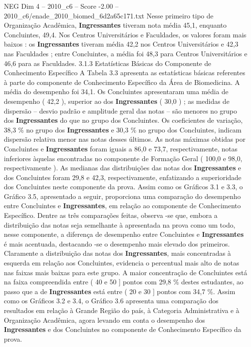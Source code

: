 \begin{textsample}{NEG Dim 4 – 2010\_c6 – Score -2.00 – 2010\_c6/enade\_2010\_biomed\_6d2a65c171.txt}
Nesse primeiro tipo de Organização Acadêmica, \textbf{Ingressantes} tiveram nota média 45,1, enquanto Concluintes, 49,4.
Nos Centros Universitários e Faculdades, os valores foram mais baixos : os \textbf{Ingressantes} tiveram média 42,2 nos Centros Universitários e 42,3 nas Faculdades ; entre Concluintes, a média foi 48,3 para Centros Universitários e 46,6 para as Faculdades. 3.1.3 Estatísticas Básicas do Componente de Conhecimento Específico A Tabela 3.3 apresenta as estatísticas básicas referentes à parte do componente de Conhecimento Específico da Área de Biomedicina.
A média do desempenho foi 34,1.
Os Concluintes apresentaram uma média de desempenho ( 42,2 ), superior ao dos \textbf{Ingressantes} ( 30,0 ) ; as medidas de dispersão – desvio padrão e amplitude geral das notas – são menores no grupo dos \textbf{Ingressantes} do que no grupo dos Concluintes.
Os coeficientes de variação, 38,3 \% no grupo dos \textbf{Ingressantes} e 30,3 \% no grupo dos Concluintes, indicam dispersão relativa menor nas notas desses últimos.
As notas máximas obtidas por Concluintes e \textbf{Ingressantes} foram iguais a 86,0 e 73,7, respectivamente, notas inferiores àquelas encontradas no componente de Formação Geral ( 100,0 e 98,0, respectivamente ).
As medianas das distribuições das notas dos \textbf{Ingressantes} e dos Concluintes foram 29,8 e 42,3, respectivamente, enfatizando a superioridade dos Concluintes neste componente da prova.
Assim como os Gráficos 3.1 e 3.3, o Gráfico 3.5, apresentado a seguir, proporciona uma comparação do desempenho entre Concluintes e \textbf{Ingressantes}, em relação ao componente de Conhecimento Específico.
Dentre as três comparações feitas, observa -se que, embora a distribuição das notas seja semelhante à apresentada na prova como um todo, nesse componente, a diferença de desempenho entre Concluintes e \textbf{Ingressantes} é mais acentuada, destacando -se o desempenho mais elevado dos primeiros.
Claramente a distribuição das notas dos \textbf{Ingressantes}, mais concentradas à esquerda em relação aos Concluintes, evidencia o percentual mais alto de notas nas faixas mais baixas para este grupo.
A maior concentração de Concluintes está na faixa compreendida entre ( 40 e 50 ] pontos com 29,8 \% destes estudantes, ao passo que a de \textbf{Ingressantes} está entre ( 20 e 30 ] pontos com 34,7 \%.
Assim como os Gráficos 3.2 e 3.4, o Gráfico 3.6 apresenta uma comparação dos resultados em relação à Grande Região do país, à Categoria Administrativa e à Organização Acadêmica, agora levando em conta o desempenho dos \textbf{Ingressantes} e dos Concluintes no componente de Conhecimento Específico da prova.

\end{textsample}
